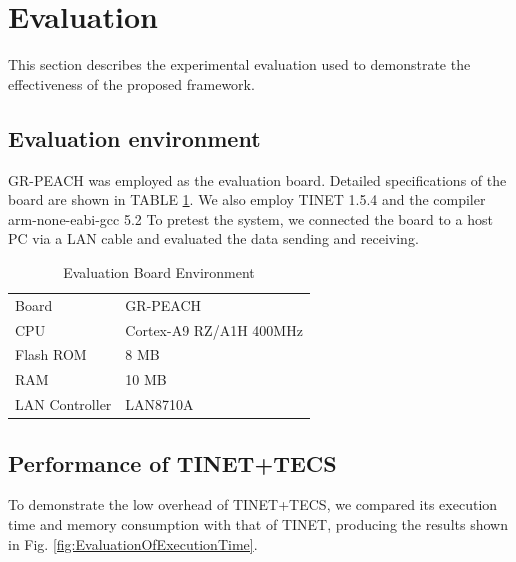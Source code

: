 \documentclass[conference]{IEEEtran/IEEEtran}
\begin{document}
\section{Evaluation}
\label{sec:Evaluation}

This section describes the experimental evaluation used to demonstrate the effectiveness of the proposed framework.

\subsection{Evaluation environment}

GR-PEACH was employed as the evaluation board.
Detailed specifications of the board are shown in TABLE \ref{tab:EvaluationBoardEnvironment}.
We also employ TINET 1.5.4 and the compiler arm-none-eabi-gcc 5.2
To pretest the system, we connected the board to a host PC via a LAN cable and evaluated the data sending and receiving.

\begin{table}[t]
    \centering
    \vspace{-1mm} \caption{Evaluation Board Environment}
    \begin{tabular}{l|l}
        \hline\hline
        Board           &   GR-PEACH                \\
        CPU             &   Cortex-A9 RZ/A1H 400MHz \\
        Flash ROM       &   8 MB                    \\
        RAM             &   10 MB                   \\
        LAN Controller  &   LAN8710A                \\
        \hline
    \end{tabular}
    \label{tab:EvaluationBoardEnvironment}
\end{table}

\subsection{Performance of TINET+TECS}

To demonstrate the low overhead of TINET+TECS, we compared its execution time and memory consumption with that of TINET, producing the results shown in Fig. \ref{fig:EvaluationOfExecutionTime}.
\end{document}
